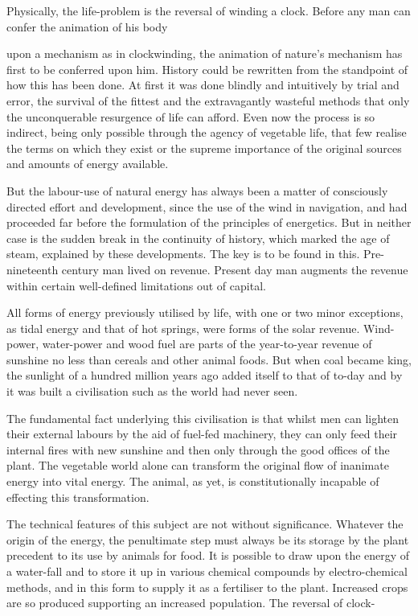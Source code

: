 \documentclass[10.5pt,twoside]{book}
\newcommand{\origpage}[1]{\clearpage\setcounter{page}{#1}}
\begin{document}
Physically, the life-problem is the reversal of winding a clock. Before any
man can confer the animation of his body

\origpage{10}

\noindent upon a mechanism as in clockwinding, the animation of nature's
mechanism has first to be conferred upon him. History could be rewritten from
the standpoint of how this has been done. At first it was done blindly and
intuitively by trial and error, the survival of the fittest and the
extravagantly wasteful methods that only the unconquerable resurgence of life
can afford. Even now the process is so indirect, being only possible through
the agency of vegetable life, that few realise the terms on which they exist
or the supreme importance of the original sources and amounts of energy
available.

But the labour-use of natural energy has always been a matter of consciously
directed effort and development, since the use of the wind in navigation, and
had proceeded far before the formulation of the principles of energetics. But
in neither case is the sudden break in the continuity of history, which marked
the age of steam, explained by these developments. The key is to be found in
this. Pre-nineteenth century man lived on revenue. Present day man augments
the revenue within certain well-defined limitations out of capital.

All forms of energy previously utilised by life, with one or two minor
exceptions, as tidal energy and that of hot springs, were forms of the solar
revenue. Wind-power, water-power and wood fuel are parts of the year-to-year
revenue of sunshine no less than cereals and other animal foods. But when coal
became king, the sunlight of a hundred million years ago added itself to that
of to-day and by it was built a civilisation such as the world had never seen.

The fundamental fact underlying this civilisation is that whilst men can
lighten their external labours by the aid of fuel-fed machinery, they can only
feed their internal fires with new sunshine and then only through the good
offices of the plant. The vegetable world alone can transform the original
flow of inanimate energy into vital energy. The animal, as yet, is
constitutionally incapable of effecting this transformation.

The technical features of this subject are not without significance. Whatever
the origin of the energy, the penultimate step must always be its storage by
the plant precedent to its use by animals for food. It is possible to draw
upon the energy of a water-fall and to store it up in various chemical
compounds by electro-chemical methods, and in this form to supply it as a
fertiliser to the plant. Increased crops are so produced supporting an
increased population. The reversal of clock-
\end{document}
